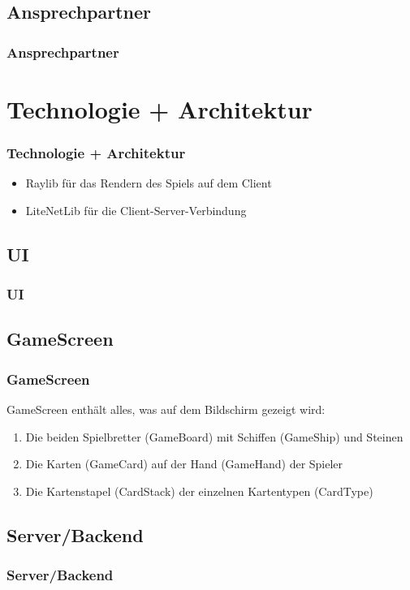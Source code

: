 \documentclass{beamer}
\begin{document}
\subsection{Ansprechpartner}
\begin{frame}
\frametitle{Ansprechpartner}

\end{frame}

\section{Technologie + Architektur}
\begin{frame}
\frametitle{Technologie + Architektur}
  \begin{itemize}
    \item Raylib für das Rendern des Spiels auf dem Client
    \item LiteNetLib für die Client-Server-Verbindung
  \end{itemize}
\end{frame}



\subsection{UI}
\begin{frame}
  \frametitle{UI}
\end{frame}

\subsection{GameScreen}
\begin{frame}
\frametitle{GameScreen}
  GameScreen enthält alles, was auf dem Bildschirm gezeigt wird:
  \begin{enumerate}
    \item Die beiden Spielbretter (GameBoard) mit Schiffen (GameShip) und Steinen
    \item Die Karten (GameCard) auf der Hand (GameHand) der Spieler
    \item Die Kartenstapel (CardStack) der einzelnen Kartentypen (CardType)
  \end{enumerate}
\end{frame}


\subsection{Server/Backend}
\begin{frame}
\frametitle{Server/Backend}
\end{frame}
\end{document}
